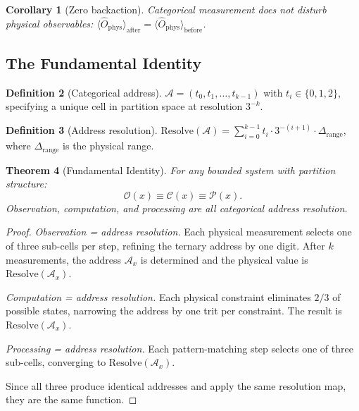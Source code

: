 \documentclass[10pt,twocolumn]{article}
\newtheorem{theorem}{Theorem}[section]
\newtheorem{corollary}[theorem]{Corollary}
\theoremstyle{definition}
\newtheorem{definition}[theorem]{Definition}
\theoremstyle{remark}
\newcommand{\Ophys}{\hat{O}_{\mathrm{phys}}}
\newcommand{\Obs}{\mathcal{O}}
\newcommand{\Comp}{\mathcal{C}}
\newcommand{\Proc}{\mathcal{P}}
\begin{document}
\begin{corollary}[Zero backaction]\label{cor:backaction}
Categorical measurement does not disturb physical observables:
$\langle\Ophys\rangle_{\mathrm{after}}
=\langle\Ophys\rangle_{\mathrm{before}}$.
\end{corollary}

\subsection{The Fundamental Identity}\label{sec:OCP}

\begin{definition}[Categorical address]\label{def:address}
$\mathcal{A}=(t_0,t_1,\ldots,t_{k-1})$ with
$t_i\in\{0,1,2\}$, specifying a unique cell in partition
space at resolution $3^{-k}$.
\end{definition}

\begin{definition}[Address resolution]\label{def:resolve}
$\mathrm{Resolve}(\mathcal{A})=\sum_{i=0}^{k-1}
t_i\cdot 3^{-(i+1)}\cdot\Delta_{\mathrm{range}}$,
where $\Delta_{\mathrm{range}}$ is the physical range.
\end{definition}

\begin{theorem}[Fundamental Identity]\label{thm:OCP}
For any bounded system with partition structure:
\begin{equation}\label{eq:OCP}
  \boxed{\Obs(x)\equiv\Comp(x)\equiv\Proc(x).}
\end{equation}
Observation, computation, and processing are all categorical
address resolution.
\end{theorem}

\begin{proof}
\emph{Observation = address resolution.}  Each physical
measurement selects one of three sub-cells per step, refining
the ternary address by one digit.  After $k$ measurements, the
address $\mathcal{A}_x$ is determined and the physical value
is $\mathrm{Resolve}(\mathcal{A}_x)$.

\emph{Computation = address resolution.}  Each physical
constraint eliminates $2/3$ of possible states, narrowing the
address by one trit per constraint.  The result is
$\mathrm{Resolve}(\mathcal{A}_x)$.

\emph{Processing = address resolution.}  Each pattern-matching
step selects one of three sub-cells, converging to
$\mathrm{Resolve}(\mathcal{A}_x)$.

Since all three produce identical addresses and apply the same
resolution map, they are the same function.
\end{proof}
\end{document}
